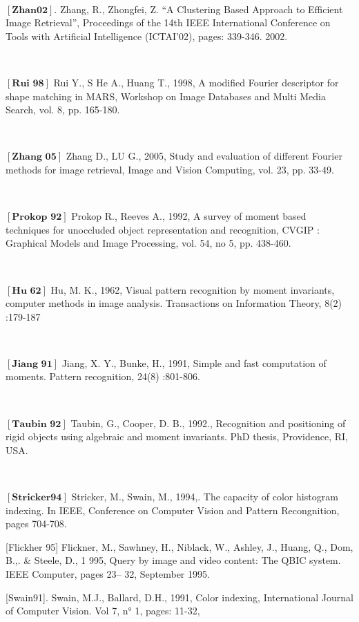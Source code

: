 \

$\left[\textbf{Zhan02}\right]$. Zhang, R., Zhongfei, Z. “A Clustering Based Approach to Efficient Image Retrieval”, Proceedings of the 14th IEEE International Conference on Tools with Artificial Intelligence (ICTAI’02), pages: 339-346. 2002.

\


$\left[\textbf{Rui 98}\right]$ Rui Y., S He A., Huang T., 1998, A modified Fourier descriptor for shape matching in
MARS, Workshop on Image Databases and Multi Media Search, vol. 8, pp. 165-180.


\

$\left[\textbf{Zhang 05}\right]$ Zhang D., LU G., 2005, Study and evaluation of different Fourier methods for image
retrieval, Image and Vision Computing, vol. 23, pp. 33-49.

\

$\left[\textbf{Prokop 92}\right]$ Prokop R., Reeves A., 1992, A survey of moment based techniques for unoccluded
object representation and recognition, CVGIP : Graphical Models and Image Processing,
vol. 54, no 5, pp. 438-460.

\

$\left[\textbf{Hu 62}\right]$ Hu, M. K., 1962, Visual pattern recognition by moment invariants, computer methods in
image analysis. Transactions on Information Theory, 8(2) :179-187

\

$\left[\textbf{Jiang 91}\right]$ Jiang, X. Y.,  Bunke, H., 1991, Simple and fast computation of moments. Pattern
recognition, 24(8) :801-806.

\

$\left[\textbf{Taubin 92}\right]$ Taubin, G.,  Cooper, D. B., 1992., Recognition and positioning of rigid objects using algebraic and moment invariants. PhD thesis, Providence, RI, USA.

\

$\left[\textbf{Stricker94}\right]$ Stricker, M.,  Swain, M., 1994,. The capacity of color histogram indexing. In IEEE, Conference on Computer Vision and Pattern Recongnition, pages 704-708.

[Flickher 95] Flickner, M., Sawhney, H., Niblack, W., Ashley, J., Huang, Q., Dom, B.,. \& Steele,
D., 1 995, Query by image and video content: The QBIC system. IEEE Computer, pages 23–
32, September 1995.

[Swain91]. Swain, M.J., Ballard, D.H., 1991, Color indexing, International Journal of Computer
Vision. Vol 7, n° 1, pages: 11-32,

